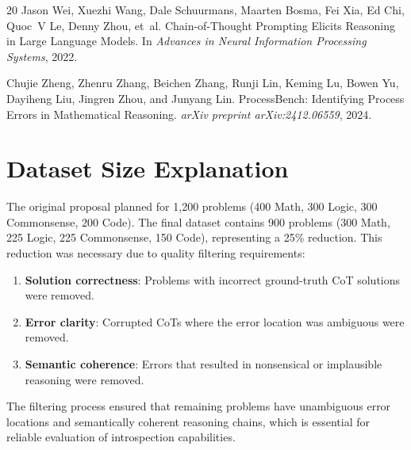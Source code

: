 \documentclass{article}
\begin{document}
\begin{thebibliography}{20}
Jason Wei, Xuezhi Wang, Dale Schuurmans, Maarten Bosma, Fei Xia, Ed Chi, Quoc~V Le, Denny Zhou, et~al.
\newblock Chain-of-Thought Prompting Elicits Reasoning in Large Language Models.
\newblock In \emph{Advances in Neural Information Processing Systems}, 2022.

Chujie Zheng, Zhenru Zhang, Beichen Zhang, Runji Lin, Keming Lu, Bowen Yu, Dayiheng Liu, Jingren Zhou, and Junyang Lin.
\newblock ProcessBench: Identifying Process Errors in Mathematical Reasoning.
\newblock \emph{arXiv preprint arXiv:2412.06559}, 2024.

\end{thebibliography}

\appendix

\section{Dataset Size Explanation}
\label{sec:dataset_size}

The original proposal planned for 1,200 problems (400 Math, 300 Logic, 300 Commonsense, 200 Code). The final dataset contains 900 problems (300 Math, 225 Logic, 225 Commonsense, 150 Code), representing a 25\% reduction. This reduction was necessary due to quality filtering requirements:

\begin{enumerate}
    \item \textbf{Solution correctness}: Problems with incorrect ground-truth CoT solutions were removed.
    \item \textbf{Error clarity}: Corrupted CoTs where the error location was ambiguous were removed.
    \item \textbf{Semantic coherence}: Errors that resulted in nonsensical or implausible reasoning were removed.
\end{enumerate}

The filtering process ensured that remaining problems have unambiguous error locations and semantically coherent reasoning chains, which is essential for reliable evaluation of introspection capabilities.
\end{document}
